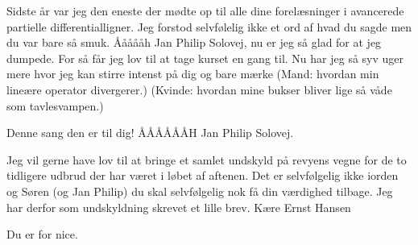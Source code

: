 \documentclass[a4paper,11pt]{article}
\begin{document}
\begin{sketch}
 Sidste år var jeg den eneste der mødte op til alle dine forelæsninger i avancerede partielle differentialligner. Jeg forstod selvfølelig ikke et ord af hvad du sagde men du var bare så smuk. 
Åååååh Jan Philip Solovej, nu er jeg så glad for at jeg dumpede. For så får jeg lov til at tage kurset en gang til. Nu har jeg så syv uger mere hvor jeg kan stirre intenst på dig og bare mærke 
(Mand: hvordan min lineære operator divergerer.)
(Kvinde: hvordan mine bukser bliver lige så våde som tavlesvampen.)


 Denne sang den er til dig! ÅÅÅÅÅÅH Jan Philip Solovej.


 Jeg vil gerne have lov til at bringe et samlet undskyld på revyens vegne for de to tidligere udbrud der har været i løbet af aftenen. Det er selvfølgelig ikke iorden og Søren (og Jan Philip) du skal selvfølgelig nok få din værdighed tilbage. 
Jeg har derfor som undskyldning skrevet et lille brev.
Kære Ernst Hansen


 Du er for nice.

\end{sketch}
\end{document}

